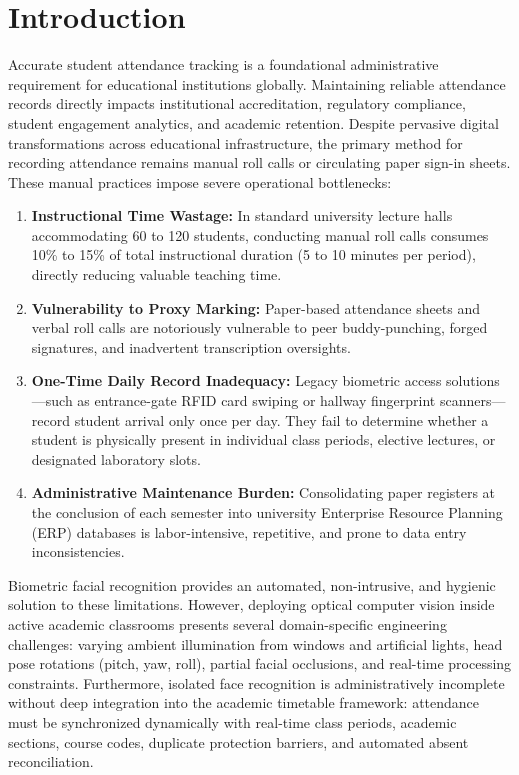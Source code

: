 \documentclass[conference]{IEEEtran}
\begin{document}
\section{Introduction}
Accurate student attendance tracking is a foundational administrative requirement for educational institutions globally. Maintaining reliable attendance records directly impacts institutional accreditation, regulatory compliance, student engagement analytics, and academic retention. Despite pervasive digital transformations across educational infrastructure, the primary method for recording attendance remains manual roll calls or circulating paper sign-in sheets. These manual practices impose severe operational bottlenecks:
\begin{enumerate}
    \item \textbf{Instructional Time Wastage:} In standard university lecture halls accommodating 60 to 120 students, conducting manual roll calls consumes 10\% to 15\% of total instructional duration (5 to 10 minutes per period), directly reducing valuable teaching time.
    \item \textbf{Vulnerability to Proxy Marking:} Paper-based attendance sheets and verbal roll calls are notoriously vulnerable to peer buddy-punching, forged signatures, and inadvertent transcription oversights.
    \item \textbf{One-Time Daily Record Inadequacy:} Legacy biometric access solutions---such as entrance-gate RFID card swiping or hallway fingerprint scanners---record student arrival only once per day. They fail to determine whether a student is physically present in individual class periods, elective lectures, or designated laboratory slots.
    \item \textbf{Administrative Maintenance Burden:} Consolidating paper registers at the conclusion of each semester into university Enterprise Resource Planning (ERP) databases is labor-intensive, repetitive, and prone to data entry inconsistencies.
\end{enumerate}

Biometric facial recognition provides an automated, non-intrusive, and hygienic solution to these limitations. However, deploying optical computer vision inside active academic classrooms presents several domain-specific engineering challenges: varying ambient illumination from windows and artificial lights, head pose rotations (pitch, yaw, roll), partial facial occlusions, and real-time processing constraints. Furthermore, isolated face recognition is administratively incomplete without deep integration into the academic timetable framework: attendance must be synchronized dynamically with real-time class periods, academic sections, course codes, duplicate protection barriers, and automated absent reconciliation.
\end{document}
